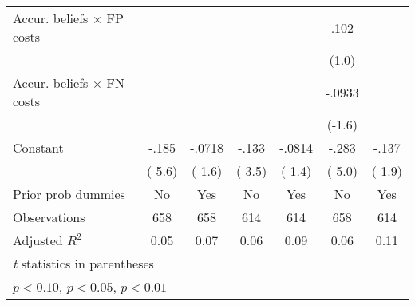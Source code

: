 \begin{table}[htbp]
\begin{tabular}{l*{6}{c}}
Accur. beliefs $\times$ FP costs&                  &                  &                  &                  &     .102         &                  \\
                &                  &                  &                  &                  &    (1.0)         &                  \\
Accur. beliefs $\times$ FN costs&                  &                  &                  &                  &   -.0933         &                  \\
                &                  &                  &                  &                  &   (-1.6)         &                  \\
Constant        &    -.185\sym{***}&   -.0718         &    -.133\sym{***}&   -.0814         &    -.283\sym{***}&    -.137\sym{*}  \\
                &   (-5.6)         &   (-1.6)         &   (-3.5)         &   (-1.4)         &   (-5.0)         &   (-1.9)         \\
Prior prob dummies &       No         &      Yes         &       No         &      Yes         &       No         &      Yes         \\
\hline
Observations    &      658         &      658         &      614         &      614         &      658         &      614         \\
Adjusted \(R^{2}\)&     0.05         &     0.07         &     0.06         &     0.09         &     0.06         &     0.11         \\
\hline\hline
\multicolumn{7}{l}{\footnotesize \textit{t} statistics in parentheses}\\
\multicolumn{7}{l}{\footnotesize \sym{*} \(p<0.10\), \sym{**} \(p<0.05\), \sym{***} \(p<0.01\)}\\
\end{tabular}
\end{table}
